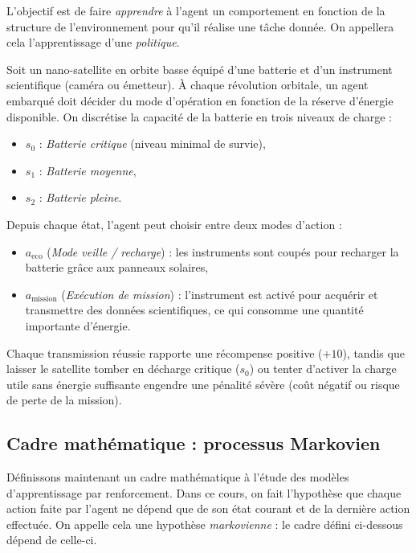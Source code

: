 L'objectif est de faire \emph{apprendre} à l'agent un comportement en fonction de la structure de l'environnement pour qu'il réalise une tâche donnée. On appellera cela l'apprentissage d'une \emph{politique}. 

\begin{example}
    Soit un nano-satellite en orbite basse équipé d'une batterie et d'un instrument scientifique (caméra ou émetteur). À chaque révolution orbitale, un agent embarqué doit décider du mode d'opération en fonction de la réserve d'énergie disponible.
    On discrétise la capacité de la batterie en trois niveaux de charge :
    \begin{itemize}
        \item $s_0$ : \emph{Batterie critique} (niveau minimal de survie),
        \item $s_1$ : \emph{Batterie moyenne},
        \item $s_2$ : \emph{Batterie pleine}.
    \end{itemize}
    Depuis chaque état, l'agent peut choisir entre deux modes d'action :
    \begin{itemize}
        \item $a_{\text{eco}}$ (\emph{Mode veille / recharge}) : les instruments sont coupés pour recharger la batterie grâce aux panneaux solaires,
        \item $a_{\text{mission}}$ (\emph{Exécution de mission}) : l'instrument est activé pour acquérir et transmettre des données scientifiques, ce qui consomme une quantité importante d'énergie.
    \end{itemize}
    Chaque transmission réussie rapporte une récompense positive ($+10$), tandis que laisser le satellite tomber en décharge critique ($s_0$) ou tenter d'activer la charge utile sans énergie suffisante engendre une pénalité sévère (coût négatif ou risque de perte de la mission).
\end{example}

\subsection{Cadre mathématique : processus Markovien}

Définissons maintenant un cadre mathématique à l'étude des modèles d'apprentissage par renforcement. Dans ce cours, on fait l'hypothèse que chaque action faite par l'agent ne dépend que de son état courant et de la dernière action effectuée. On appelle cela une hypothèse \emph{markovienne} : le cadre défini ci-dessous dépend de celle-ci. 


